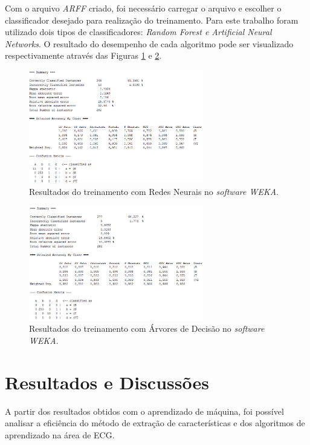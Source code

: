 \documentclass[conference]{IEEEtran}
\begin{document}
Com o arquivo \textit{ARFF} criado, foi necessário carregar o arquivo e escolher o classificador desejado para realização do treinamento. Para este trabalho foram utilizado dois tipos de classificadores: \textit{Random Forest e Artificial Neural Networks}. O resultado do desempenho de cada algoritmo pode ser visualizado respectivamente através das Figuras \ref{wekaResultANN8020} e \ref{wekaResultRandomForest8020}.

\begin{figure}[!h]
	\centering
	\includegraphics[width=3in]{img/wekaResultANN8020}
	\caption{Resultados do treinamento com Redes Neurais no \textit{software WEKA}.}
	\label{wekaResultANN8020}
\end{figure}

\begin{figure}[!h]
	\centering
	\includegraphics[width=3in]{img/wekaResultRandomForest8020}
	\caption{Resultados do treinamento com Árvores de Decisão no \textit{software WEKA}.}
	\label{wekaResultRandomForest8020}
\end{figure}

\section{Resultados e Discussões}

A partir dos resultados obtidos com o aprendizado de máquina, foi possível analisar a eficiência do método de extração de características e dos algoritmos de aprendizado na área de ECG.
\end{document}

